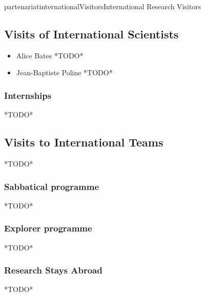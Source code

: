 \documentclass{ra2018}
\begin{document}
\begin{module}{partenariat}{internationalVisitors}{International Research Visitors}

\subsection{Visits of International Scientists}

\begin{itemize}
    \item Alice Bates *TODO*
    \item Jean-Baptiste Poline *TODO*
\end{itemize}

   \subsubsection{Internships}
   *TODO*




\subsection{Visits to International Teams}
*TODO*
   \subsubsection{Sabbatical programme}
   *TODO*




   \subsubsection{Explorer programme}
   *TODO*




   \subsubsection{Research Stays Abroad}
   *TODO*






\end{module}
\end{document}
